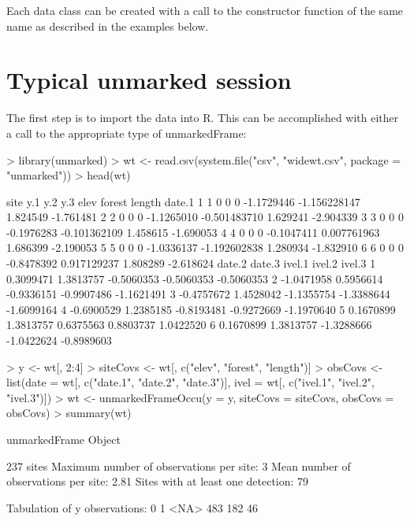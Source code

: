 \documentclass[a4paper]{article}
\renewenvironment{Schunk}{\vspace{\topsep}}{\vspace{\topsep}}
\begin{document}
Each data class can be created with a call to the constructor function
of the same name as described in the examples below.


\section{Typical unmarked session}

The first step is to import the data into R.  This can be accomplished
with either a call to the appropriate type of unmarkedFrame:

\begin{Schunk}
\begin{Sinput}
> library(unmarked)
> wt <- read.csv(system.file("csv", "widewt.csv", package = "unmarked"))
> head(wt)
\end{Sinput}
\begin{Soutput}
  site y.1 y.2 y.3       elev       forest   length    date.1
1    1   0   0   0 -1.1729446 -1.156228147 1.824549 -1.761481
2    2   0   0   0 -1.1265010 -0.501483710 1.629241 -2.904339
3    3   0   0   0 -0.1976283 -0.101362109 1.458615 -1.690053
4    4   0   0   0 -0.1047411  0.007761963 1.686399 -2.190053
5    5   0   0   0 -1.0336137 -1.192602838 1.280934 -1.832910
6    6   0   0   0 -0.8478392  0.917129237 1.808289 -2.618624
      date.2    date.3     ivel.1     ivel.2     ivel.3
1  0.3099471 1.3813757 -0.5060353 -0.5060353 -0.5060353
2 -1.0471958 0.5956614 -0.9336151 -0.9907486 -1.1621491
3 -0.4757672 1.4528042 -1.1355754 -1.3388644 -1.6099164
4 -0.6900529 1.2385185 -0.8193481 -0.9272669 -1.1970640
5  0.1670899 1.3813757  0.6375563  0.8803737  1.0422520
6  0.1670899 1.3813757 -1.3288666 -1.0422624 -0.8989603
\end{Soutput}
\begin{Sinput}
> y <- wt[, 2:4]
> siteCovs <- wt[, c("elev", "forest", "length")]
> obsCovs <- list(date = wt[, c("date.1", "date.2", "date.3")], 
     ivel = wt[, c("ivel.1", "ivel.2", "ivel.3")])
> wt <- unmarkedFrameOccu(y = y, siteCovs = siteCovs, obsCovs = obsCovs)
> summary(wt)
\end{Sinput}
\begin{Soutput}
unmarkedFrame Object

237 sites
Maximum number of observations per site: 3 
Mean number of observations per site: 2.81 
Sites with at least one detection: 79 

Tabulation of y observations:
   0    1 <NA> 
 483  182   46 


\end{Soutput}
\end{Schunk}
\end{document}
